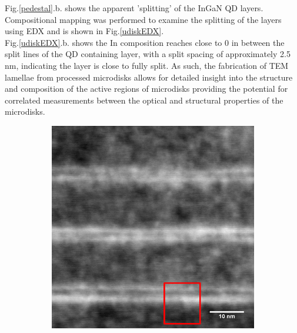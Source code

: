 \FloatBarrier
\squeezeup
Fig.\ref{pedestal}.b. shows the apparent 'splitting' of the InGaN QD layers. Compositional mapping was performed to examine the splitting of the layers using EDX and is shown in Fig.\ref{udiskEDX}.\\
Fig.\ref{udiskEDX}.b. shows the In composition reaches close to 0 in between the split lines of the QD containing layer, with a split spacing of approximately 2.5 nm, indicating the layer is close to fully split. As such, the fabrication of TEM lamellae from processed microdisks allows for detailed insight into the structure and composition of the active regions of microdisks providing the potential for correlated measurements between the optical and structural properties of the microdisks.

\begin{figure}
	\begin{subfigure}[b]{0.3\textwidth}
		\centering
		\includegraphics[width=.85\linewidth]{Figs/Ch4/edxtarget}
		\caption{}
		

\end{subfigure}
\end{figure}
